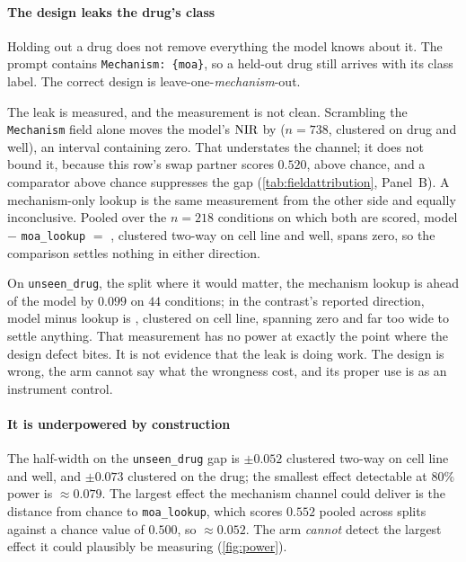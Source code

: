 \paragraph{The design leaks the drug's class} Holding out a drug does not
remove everything the model knows about it. The prompt contains
\texttt{Mechanism: \{moa\}}, so a held-out drug still arrives with its class
label. The correct design is leave-one-\emph{mechanism}-out.

The leak is measured, and the measurement is not clean. Scrambling the
\texttt{Mechanism} field alone moves the model's $\textrm{NIR}$ by
 ($n = \num{738}$, clustered on drug and well), an
interval containing zero. That understates the channel; it does not bound it,
because this row's swap partner scores $0.520$, above chance, and a comparator
above chance suppresses the gap (\cref{tab:fieldattribution}, Panel~B). A
mechanism-only lookup is the same measurement from the other side and equally
inconclusive. Pooled over the $n = \num{218}$ conditions on which both are
scored, model $-$ \texttt{moa\_lookup} $=$ ,
clustered two-way on cell line and well, spans zero, so the comparison settles
nothing in either direction.

On \texttt{unseen\_drug}, the split where it would matter, the mechanism lookup
is ahead of the model by $0.099$ on $44$ conditions; in the contrast's reported
direction, model minus lookup is , clustered on cell
line, spanning zero and far too wide to settle anything. That measurement has no
power at exactly the point where the design defect bites. It is not evidence
that the leak is doing work. The design is wrong, the arm cannot say what the
wrongness cost, and its proper use is as an instrument control.

\paragraph{It is underpowered by construction} The half-width on the
\texttt{unseen\_drug} gap is $\pm 0.052$ clustered two-way on cell line and
well, and $\pm 0.073$ clustered on the drug; the smallest effect detectable at
$80\%$ power is $\approx 0.079$. The largest effect the mechanism channel could
deliver is the distance from chance to \texttt{moa\_lookup}, which scores
$0.552$ pooled across splits against a chance value of $0.500$, so $\approx
0.052$. The arm \emph{cannot} detect the largest effect it could plausibly be
measuring (\cref{fig:power}).

